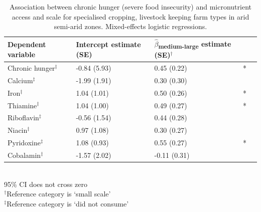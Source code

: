 \begin{table}[H]
  \captionsetup{singlelinecheck = false, justification=justified}
  \caption{
  Association between chronic hunger (severe food insecurity) and micronutrient access and scale for specialised cropping, livestock keeping farm types in arid semi-arid zones. Mixed-effects logistic regressions.
  }
  \label{tab:C_16}
  \small
\begin{tabular}{L{5cm} C{2.5cm} C{2.5cm} C{2cm} C{2cm}}
\toprule
Dependent variable & Intercept estimate (SE) & $\hat{\beta}$\textsubscript{medium-large} estimate (SE)$^{\dag}$ &  \\
\midrule
Chronic hunger$^{\ddag}$ & -0.84 (5.93) & 0.45 (0.22) & * \\
Calcium$^{\ddag}$ & -1.99 (1.91) & 0.30 (0.30) & \\
Iron$^{\ddag}$ & 1.04 (1.01) & 0.50 (0.26) & * \\
Thiamine$^{\ddag}$ & 1.04 (1.00) & 0.49 (0.27) & * \\
Riboflavin$^{\ddag}$ & -0.56 (1.54) & 0.44 (0.28) &  \\
Niacin$^{\ddag}$ & 0.97 (1.08) & 0.30 (0.27) &  \\
Pyridoxine$^{\ddag}$ & 1.08 (0.93) & 0.55 (0.27) & * \\
Cobalamin$^{\ddag}$ & -1.57 (2.02) & -0.11 (0.31) & \\
\bottomrule
\end{tabular}
\footnotesize
\raggedright
\\
95\% CI does not cross zero \\
$^{\dag}$Reference category is `small scale' \\
$^{\ddag}$Reference category is `did not consume'
\end{table}
